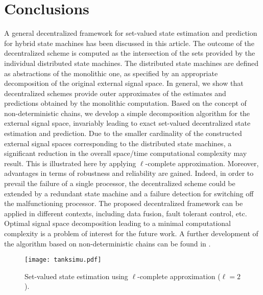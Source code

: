 \documentclass[a4paper, 10pt, conference]{ieeeconf}
\begin{document}
\vspace{-23pt}
\section{Conclusions}
A general decentralized framework for set-valued state estimation and prediction for hybrid state machines has been discussed in this article. The outcome of the decentralized scheme is computed as the intersection of the sets provided by  the individual distributed state machines. The distributed state machines are defined as abstractions of the monolithic one, as specified by an appropriate decomposition of the original external signal space. In general, we show that decentralized schemes provide outer approximates of the estimates and predictions obtained by the monolithic computation.
Based on the concept of non-deterministic chains, we develop a simple decomposition algorithm for the external signal space, invariably leading to exact set-valued decentralized state estimation and prediction.
Due to the smaller cardinality of the constructed external signal spaces corresponding to the distributed state machines,
a significant reduction in the overall space/time computational complexity may result. This is illustrated here by applying $\ell$-complete approximation. Moreover, advantages in terms of robustness and reliability are gained. Indeed, in order to prevail the failure of a single processor, the decentralized scheme could be extended by a redundant state machine and a failure detection for switching off the malfunctioning processor. The proposed decentralized framework can be applied in different contexts, including data fusion, fault tolerant control, etc. Optimal signal space decomposition leading to a minimal computational complexity is a problem of interest for the future work. A further development of the algorithm based on non-deterministic chains can be found  in \cite{bajc_rom:2011}.





\begin{figure}[t]
\centering
\texttt{[image: tanksimu.pdf]}
\vspace{-10pt}
\caption{Set-valued state estimation using $\ell$-complete approximation ($\ell=2$).}
\label{fig:sim}
\vspace{-15pt}
\end{figure}






\end{document}
